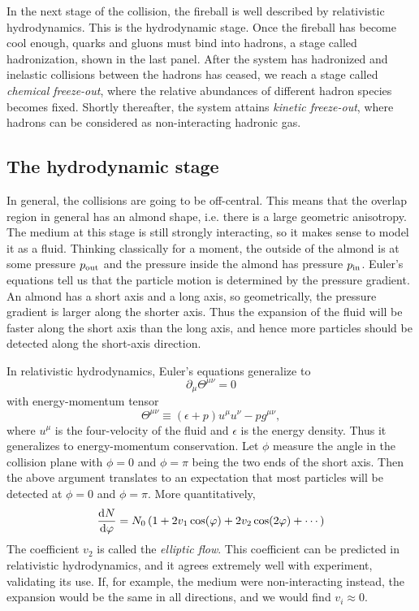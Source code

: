 In the next stage of the collision, the fireball is well described by
relativistic hydrodynamics. This is the hydrodynamic stage. Once the fireball
has become cool enough, quarks and gluons must bind into hadrons, a stage called
hadronization, shown in the last panel. After the system has hadronized and
inelastic collisions between the hadrons has ceased, we reach a stage called
{\it chemical freeze-out}, where the relative abundances of
different hadron species becomes fixed. Shortly thereafter, the system attains
{\it kinetic freeze-out}, where hadrons can be
considered as non-interacting hadronic gas.

\subsection{The hydrodynamic stage}

In general, the collisions are going to be off-central. This means that the
overlap region in general has an almond shape, i.e. there is a large geometric
anisotropy. The medium at this stage is still strongly interacting, so it makes
sense to model it as a fluid. Thinking classically for a moment, the outside
of the almond is at some pressure $p_{\rm out}$ and the pressure inside the
almond has pressure $p_{\rm in}$. Euler's equations tell us that the particle
motion is determined by the pressure gradient. An almond has a short axis and a
long axis, so geometrically, the pressure gradient is larger along the shorter
axis. Thus the expansion of the fluid will be faster along the short axis than
the long axis, and hence more particles should be detected along the short-axis
direction.

In relativistic hydrodynamics, Euler's equations generalize to
\begin{equation}\label{eq:EMconserve}
\partial_\mu \Theta^{\mu\nu}=0
\end{equation}
with energy-momentum tensor
\begin{equation}
\Theta^{\mu\nu}\equiv\left(\epsilon+p\right)u^\mu u^\nu-pg^{\mu\nu},
\end{equation}
where $u^\mu$ is the four-velocity of the fluid and $\epsilon$ is the energy
density. Thus it generalizes to energy-momentum conservation.
Let $\phi$ measure the angle in the collision
plane with $\phi=0$ and $\phi=\pi$ being the two ends of the short axis. Then
the above argument translates to an expectation that most particles will be
detected at $\phi=0$ and $\phi=\pi$. More quantitatively,
\begin{equation}
\dv{N}{\varphi}=N_0\left(1 +2v_1\cos(\varphi) + 2v_2 \cos(2\varphi) + \cdots\right)
\end{equation}
The coefficient $v_2$ is called the {\it elliptic flow}.
This coefficient can be predicted in relativistic hydrodynamics, and it agrees
extremely well with experiment, validating its use. If, for example, the medium
were non-interacting instead, the expansion would be the same in all directions,
and we would find $v_i\approx 0$.

